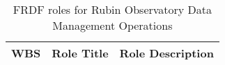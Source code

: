 \normalsize \begin{longtable} {|p{}|p{}|p{}|} \caption{FRDF roles for Rubin Observatory Data Management Operations \label{tab:frdfroles}}\\ 
\hline 
\textbf{WBS}&\textbf{Role Title}&\textbf{Role Description} \\ \hline
\end{longtable} \normalsize
